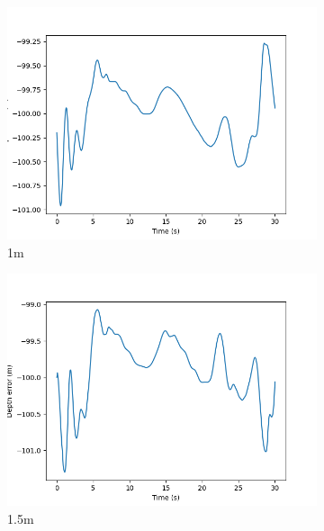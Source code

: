 \documentclass[class=article, crop=false]{standalone}
\begin{document}
\begin{figure}
\begin{subfigure}[b]{0.48\textwidth}
        \label{}
    \end{subfigure}
    \vfill
    \begin{subfigure}[b]{0.48\textwidth}
        \centering
        \includegraphics{scenario1/rov-0m/1.0m/rov_depth_error_controlled}
        \caption{1m}
        \label{}
    \end{subfigure}
    \hfill
    \begin{subfigure}[b]{0.48\textwidth}
        \centering
        \includegraphics{scenario1/rov-0m/1.5m/rov_depth_error_controlled}
        \caption{1.5m}
        \label{}
    \end{subfigure}
    \vfill
    \begin{subfigure}[b]{0.48\textwidth}

\end{subfigure}
\end{figure}
\end{document}
